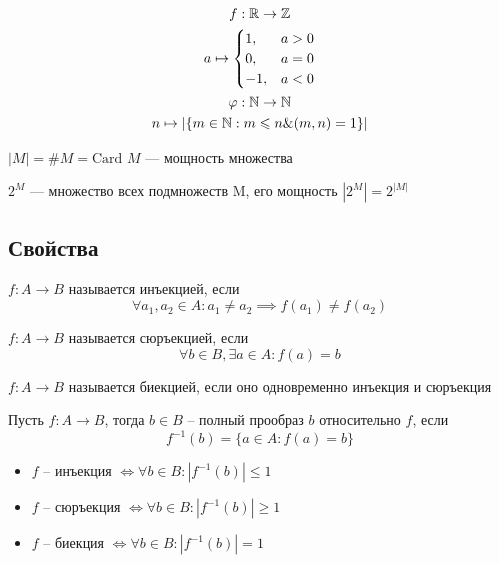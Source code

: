 \documentclass[main]{subfiles}
\begin{document}
\begin{gather*}
    f: \mathbb{R} \to \mathbb{Z} \\
    a \mapsto \begin{cases}
        1,  & a > 0 \\
        0,  & a =0  \\
        -1, & a < 0
    \end{cases}\\
    \varphi: \mathbb{N} \to \mathbb{N} \\
    n \mapsto |\{m \in \mathbb{N}: m \leqslant n \& (m,n) = 1\}|
\end{gather*}

\begin{definition}
    $|M| = \#M = \text{Card } M$ --- мощность множества
\end{definition}
\begin{definition}
    $2^M$ --- множество всех подмножеств M, его мощность $|2^M| = 2^{|M|}$
\end{definition}

\subsection{Свойства}
\begin{prop}
    $f: A \to B$ называется инъекцией, если
    \[\forall a_1, a_2 \in A: a_1 \neq a_2 \implies f(a_1)\neq f(a_2)\]
\end{prop}
\begin{prop}
    $f: A \to B$ называется сюръекцией, если \[\forall b \in B, \exists a \in A: f(a) = b\]
\end{prop}
\begin{prop}
    $f: A \to B$ называется биекцией, если оно одновременно инъекция и сюръекция
\end{prop}
\begin{definition}
    Пусть $f: A \to B$, тогда $b\in B$ -- полный прообраз $b$ относительно $f$, если
    \[f^{-1}(b) = \{a \in A : f(a) = b\}\]
\end{definition}

\begin{corollary}
    \begin{itemize}
        \item $f$ -- инъекция $\Leftrightarrow \forall b \in B: |f^{-1}(b)| \le 1$
        \item $f$ -- сюръекция $\Leftrightarrow \forall b \in B:|f^{-1}(b)| \ge 1$
        \item $f$ -- биекция $\Leftrightarrow \forall b \in B:|f^{-1}(b)| = 1$
    \end{itemize}
\end{corollary}
\end{document}
